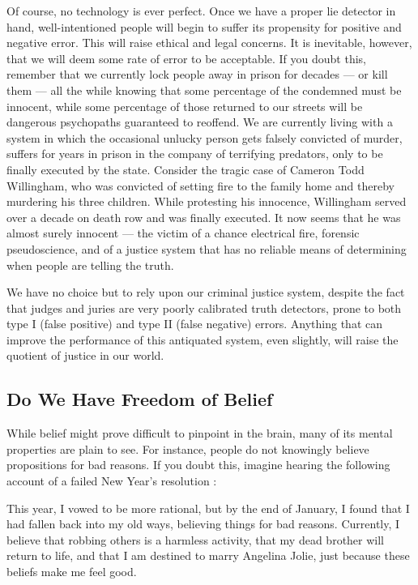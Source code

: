 \documentclass[a4paper,14pt]{extbook}
\begin{document}
Of course, no technology is ever perfect.
Once we have a proper lie detector in hand, well-intentioned people will begin to suffer its propensity for positive and negative error.
This will raise ethical and legal concerns.
It is inevitable, however, that we will deem some rate of error to be acceptable.
If you doubt this, remember that we currently lock people away in prison for decades --- or kill them --- all the while knowing that some percentage of the condemned must be innocent, while some percentage of those returned to our streets will be dangerous psychopaths guaranteed to reoffend.
We are currently living with a system in which the occasional unlucky person gets falsely convicted of murder, suffers for years in prison in the company of terrifying predators, only to be finally executed by the state.
Consider the tragic case of Cameron Todd Willingham, who was convicted of setting fire to the family home and thereby murdering his three children.
While protesting his innocence, Willingham served over a decade on death row and was finally executed.
It now seems that he was almost surely innocent --- the victim of a chance electrical fire, forensic pseudoscience, and of a justice system that has no reliable means of determining when people are telling the truth.

We have no choice but to rely upon our criminal justice system, despite the fact that judges and juries are very poorly calibrated truth detectors, prone to both type I (false positive) and type II (false negative) errors.
Anything that can improve the performance of this antiquated system, even slightly, will raise the quotient of justice in our world.

\subsection{Do We Have Freedom of Belief}

While belief might prove difficult to pinpoint in the brain, many of its mental properties are plain to see.
For instance, people do not knowingly believe propositions for bad reasons.
If you doubt this, imagine hearing the following account of a failed New Year’s resolution :

This year, I vowed to be more rational, but by the end of January, I found that I had fallen back into my old ways, believing things for bad reasons.
Currently, I believe that robbing others is a harmless activity, that my dead brother will return to life, and that I am destined to marry Angelina Jolie, just because these beliefs make me feel good.
\end{document}
